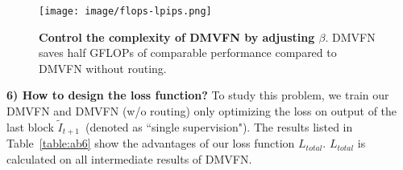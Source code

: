 \documentclass[10pt,twocolumn,letterpaper]{article}
\begin{document}
\begin{figure}[th]
 	\centering
 \texttt{[image: image/flops-lpips.png]}
\caption{\textbf{Control the complexity of DMVFN by adjusting $\beta$}. DMVFN saves half GFLOPs of comparable performance compared to DMVFN without routing.}
 	\label{fig:flops}
 \end{figure}


\noindent
\textbf{6) How to design the loss function?} To study this problem, we train our DMVFN and DMVFN (w/o routing) only optimizing the loss on output of the last block $\tilde{I}_{t+1}$~(denoted as ``single supervision"). The results listed in Table~\ref{table:ab6} show the advantages of our loss function $L_{total}$. $L_{total}$ is calculated on all intermediate results of DMVFN.
\begin{table*}[th]
\caption{\textbf{Results of DMVFN with different loss settings}. The evaluation metric is MS-SSIM ($\times10^{-2}$).}

\centering
{}
\label{table:ab6}
\end{table*}
\end{document}
